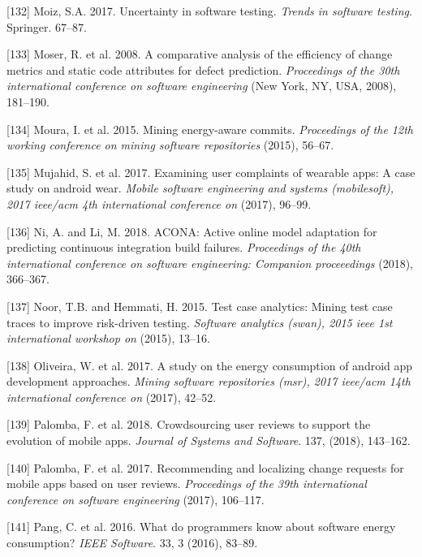 \documentclass[]{book}
\begin{document}
\hypertarget{ref-moiz2017uncertainty}{}
{[}132{]} Moiz, S.A. 2017. Uncertainty in software testing. \emph{Trends
in software testing}. Springer. 67--87.

\hypertarget{ref-Moser2008}{}
{[}133{]} Moser, R. et al. 2008. A comparative analysis of the
efficiency of change metrics and static code attributes for defect
prediction. \emph{Proceedings of the 30th international conference on
software engineering} (New York, NY, USA, 2008), 181--190.

\hypertarget{ref-MPEC2015}{}
{[}134{]} Moura, I. et al. 2015. Mining energy-aware commits.
\emph{Proceedings of the 12th working conference on mining software
repositories} (2015), 56--67.

\hypertarget{ref-mujahid2017examining}{}
{[}135{]} Mujahid, S. et al. 2017. Examining user complaints of wearable
apps: A case study on android wear. \emph{Mobile software engineering
and systems (mobilesoft), 2017 ieee/acm 4th international conference on}
(2017), 96--99.

\hypertarget{ref-ni2018acona}{}
{[}136{]} Ni, A. and Li, M. 2018. ACONA: Active online model adaptation
for predicting continuous integration build failures. \emph{Proceedings
of the 40th international conference on software engineering: Companion
proceeedings} (2018), 366--367.

\hypertarget{ref-noor2015test}{}
{[}137{]} Noor, T.B. and Hemmati, H. 2015. Test case analytics: Mining
test case traces to improve risk-driven testing. \emph{Software
analytics (swan), 2015 ieee 1st international workshop on} (2015),
13--16.

\hypertarget{ref-OOC2017}{}
{[}138{]} Oliveira, W. et al. 2017. A study on the energy consumption of
android app development approaches. \emph{Mining software repositories
(msr), 2017 ieee/acm 14th international conference on} (2017), 42--52.

\hypertarget{ref-palomba2018crowdsourcing}{}
{[}139{]} Palomba, F. et al. 2018. Crowdsourcing user reviews to support
the evolution of mobile apps. \emph{Journal of Systems and Software}.
137, (2018), 143--162.

\hypertarget{ref-palomba2017recommending}{}
{[}140{]} Palomba, F. et al. 2017. Recommending and localizing change
requests for mobile apps based on user reviews. \emph{Proceedings of the
39th international conference on software engineering} (2017), 106--117.

\hypertarget{ref-PHA2016}{}
{[}141{]} Pang, C. et al. 2016. What do programmers know about software
energy consumption? \emph{IEEE Software}. 33, 3 (2016), 83--89.
\end{document}

